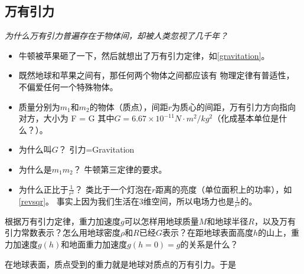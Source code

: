 \documentclass[a4paper,9pt]{ctexart}
\begin{document}
\subsection{万有引力}
\emph{为什么万有引力普遍存在于物体间，却被人类忽视了几千年？}
\begin{itemize}
\item
{}牛顿被苹果砸了一下，然后就想出了万有引力定律，如\cref{gravitation}。
\item
既然地球和苹果之间有，那任何两个物体之间都应该有 \so 物理定律有普适性，不偏爱任何一个特殊物体。
\item
质量分别为$m_1$和$m_2$的物体（质点），间距$r$为质心的间距，万有引力方向指向对方，大小为
\beq
F = G 
\eeq
其中$G = 6.67\times 10^{-11}\unit{N\cdot m^2/kg^2}$（化成基本单位是什么？）。
\item
为什么叫$G$？ \so 引力=Gravitation
\item
为什么是$m_1m_2$？ \so 牛顿第三定律的要求。
\item
为什么正比于$\frac{1}{r^2}$？ \so 类比于一个灯泡在$r$距离的亮度（单位面积上的功率），如\cref{revsqr}。 \so 事实上因为我们生活在3维空间，所以电场力也是$\frac{1}{r^2}$的。
\end{itemize}
\begin{eg}
根据万有引力定律，重力加速度$g$可以怎样用地球质量$M$和地球半径$R$，以及万有引力常数表示？怎么用地球密度$\rho$和$R$已经$G$表示？在距地球表面高度$h$的山上，重力加速度$g(h)$和地面重力加速度$g(h=0) = g$的关系是什么？
\end{eg}
\begin{ans}
在地球表面，质点受到的重力就是地球对质点的万有引力。于是
\vspace{6cm}
\end{ans}
\end{document}
